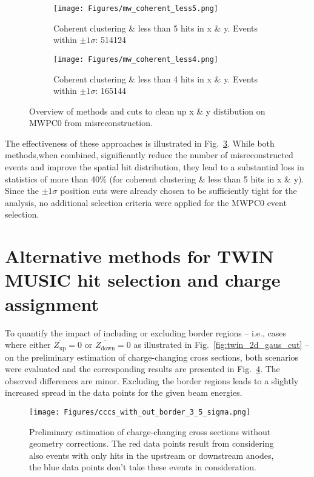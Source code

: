 \begin{appendices}
\begin{figure}
\begin{subfigure}{.45\textwidth}
  \centering
  \texttt{[image: Figures/mw\_coherent\_less5.png]}
  \caption{Coherent clustering \& less than 5 hits in x \& y. Events within $\pm1\sigma$: 514124}
  \label{fig:sub-third}
\end{subfigure}
\begin{subfigure}{.45\textwidth}
  \centering
  \texttt{[image: Figures/mw\_coherent\_less4.png]}
  \caption{Coherent clustering \& less than 4 hits in x \& y. Events within $\pm1\sigma$\protect\footnotemark: 165144}
  \label{fig:sub-fourth}
\end{subfigure}
\caption{Overview of methods and cuts to clean up x \& y distibution on MWPC0 from misreconstruction.}
\label{fig:mw0_approaches}
\end{figure}
The effectiveness of these approaches is illustrated in Fig.~\ref{fig:mw0_approaches}. While both methods,when combined, significantly reduce the number of misreconstructed events and improve the spatial hit distribution, they lead to a substantial loss in statistics of more than 40\% (for coherent clustering \& less than 5 hits in x \& y).\newline
Since the $\pm1\sigma$ position cuts were already chosen to be sufficiently tight for the analysis, no additional selection criteria were applied for the MWPC0 event selection.


\section {Alternative methods for TWIN MUSIC hit selection and charge assignment} \label{app:twin_alternative}
To quantify the impact of including or excluding border regions -- i.e., cases where either $\overline{Z_{\text{up}}} = 0$ or $\overline{Z_{\text{down}}} = 0$ as illustrated in Fig.~\ref{fig:twin_2d_gaus_cut} -- on the preliminary estimation of charge-changing cross sections, both scenarios were evaluated and the corresponding results are presented in Fig.~\ref{fig:cccs_with_out_border_3_5}. The observed differences are minor. Excluding the border regions leads to a slightly increased spread in the data points for the given beam energies.\newline
\begin{figure}[htpb]
    \centering
    \texttt{[image: Figures/cccs\_with\_out\_border\_3\_5\_sigma.png]}
    \caption{
    Preliminary estimation of charge-changing cross sections without geometry corrections. The red data points result from considering also events with only hits in the upstream or downstream anodes, the blue data points don't take these events in consideration.
     }
    \label{fig:cccs_with_out_border_3_5}
\end{figure}


\end{appendices}
